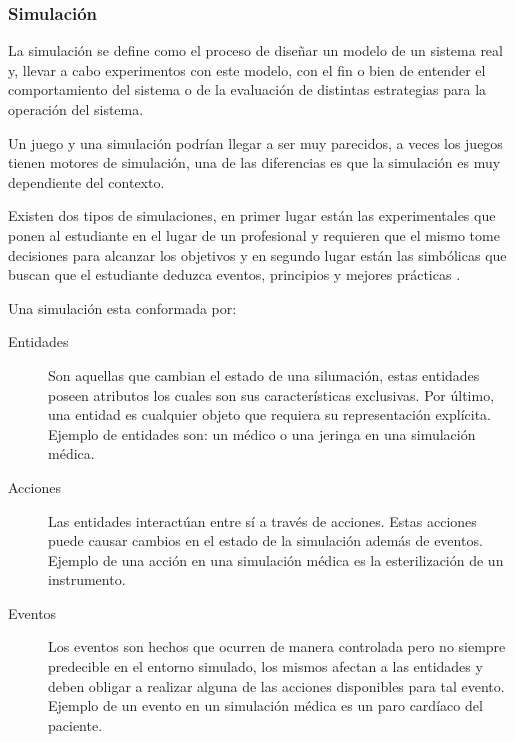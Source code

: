 \subsubsection{Simulación}

La simulación se define como el proceso de diseñar un modelo de un sistema real
y, llevar a cabo experimentos con este modelo, con el fin o bien de entender el
comportamiento del sistema o de la evaluación de distintas estrategias para la
operación del sistema\cite{ingalls2008introduction}. 

Un juego y una simulación podrían llegar a ser muy parecidos, a veces los juegos
tienen motores de simulación, una de las diferencias es que la simulación es muy
dependiente del contexto. 

Existen dos tipos de simulaciones, en primer lugar están las experimentales que
ponen al estudiante en el lugar de un profesional y requieren que el mismo tome
decisiones para alcanzar los objetivos y en segundo lugar están las simbólicas
que buscan que el estudiante deduzca eventos, principios y mejores prácticas
\cite{charsky:2010}. 

Una simulación esta conformada por:

\begin{description}

\item[Entidades] Son aquellas que cambian el estado de una silumación, estas
	entidades poseen atributos los cuales son sus características
	exclusivas. Por último, una entidad es cualquier objeto que requiera su
	representación explícita. Ejemplo de entidades son: un médico o una
	jeringa en una simulación médica.

\item[Acciones] Las entidades interactúan entre sí a través de acciones. Estas
	acciones puede causar cambios en el estado de la simulación además de
	eventos. Ejemplo de una acción en una simulación médica es la
	esterilización de un instrumento.

\item[Eventos] Los eventos son hechos que ocurren de manera controlada pero no
	siempre predecible en el entorno simulado, los mismos afectan a las
	entidades y deben obligar a realizar alguna de las acciones disponibles
	para tal evento. Ejemplo de un evento en un simulación médica es un paro
	cardíaco del paciente.

\end{description}

